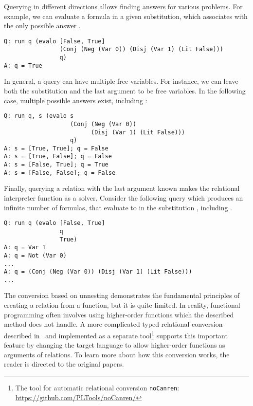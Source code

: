 

Querying  in different directions allows finding answers for various problems. 
For example, we can evaluate a formula in a given substitution, which associates  with the only possible answer .

\begin{lstlisting}[basicstyle=\small]
Q: run q (evalo [False, True] 
                (Conj (Neg (Var 0)) (Disj (Var 1) (Lit False))) 
                q)
A: q = True 
\end{lstlisting}


In general, a query can have multiple free variables. 
For instance, we can leave both the substitution and the last argument to be free variables. 
In the following case, multiple possible answers exist, including : 

\begin{lstlisting}[basicstyle=\small]
Q: run q, s (evalo s
                   (Conj (Neg (Var 0)) 
                         (Disj (Var 1) (Lit False))) 
                   q)
A: s = [True, True]; q = False
A: s = [True, False]; q = False
A: s = [False, True]; q = True
A: s = [False, False]; q = False
\end{lstlisting}

Finally, querying a relation with the last argument  known makes the relational interpreter function as a solver. 
Consider the following query which produces an infinite number of formulas, that evaluate to  in the substitution , including . 

\begin{lstlisting}[basicstyle=\small]
Q: run q (evalo [False, True]
                q
                True)
A: q = Var 1
A: q = Not (Var 0)
...
A: q = (Conj (Neg (Var 0)) (Disj (Var 1) (Lit False)))
... 
\end{lstlisting}

The conversion based on unnesting demonstrates the fundamental principles of creating a relation from a function, but it is quite limited. 
In reality, functional programming often involves using higher-order functions which the described method does not handle. 
A more complicated typed relational conversion described in~\cite{lozov2018typed,lozov2022automated} and implemented as a separate tool\footnote{The tool for automatic relational conversion \texttt{noCanren}: \url{https://github.com/PLTools/noCanren/}} supports this important feature by changing the target language to allow higher-order functions as arguments of relations. 
To learn more about how this conversion works, the reader is directed to the original papers. 

